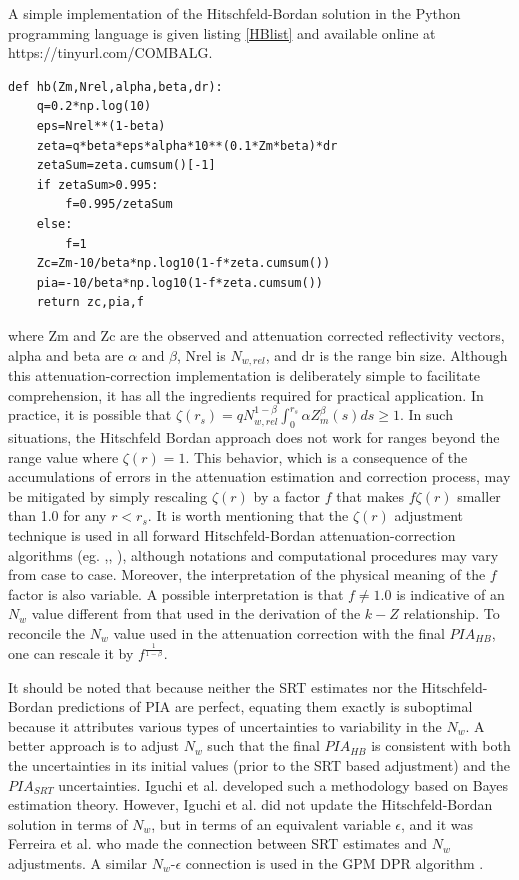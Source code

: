 \documentclass[10pt]{ietbook}
\begin{document}
A simple implementation of the Hitschfeld-Bordan solution in the Python programming language is given listing \ref{HBlist} and
available online at \\https://tinyurl.com/COMBALG.
\begin{lstlisting}[caption={Python implementation of the Histchfeld-Bordan solution.},captionpos=b,label={HBlist}]
def hb(Zm,Nrel,alpha,beta,dr):
    q=0.2*np.log(10)
    eps=Nrel**(1-beta)
    zeta=q*beta*eps*alpha*10**(0.1*Zm*beta)*dr
    zetaSum=zeta.cumsum()[-1]
    if zetaSum>0.995:
        f=0.995/zetaSum
    else:
        f=1
    Zc=Zm-10/beta*np.log10(1-f*zeta.cumsum())
    pia=-10/beta*np.log10(1-f*zeta.cumsum())
    return zc,pia,f
\end{lstlisting}
where Zm and Zc are the observed and attenuation corrected reflectivity vectors, alpha and beta are $\alpha$ and $\beta$, Nrel is $N_{w,rel}$,
and dr is the range bin size.  Although this attenuation-correction implementation is deliberately simple to 
facilitate comprehension, it has all the ingredients
required for practical application.  In practice, it is possible that $\zeta (r_s) =q N_{w,rel}^{1-\beta} \int_0^{r_s}\alpha Z_m^\beta(s)ds \geq 1$. In 
such situations, the Hitschfeld Bordan approach does not work for ranges beyond the range value where $\zeta (r)=1$.  This behavior, which is 
a consequence of the  accumulations of errors in the attenuation estimation and correction process, may be mitigated by simply rescaling 
$\zeta(r)$ by a factor $f$ that makes $f \zeta(r)$ smaller than 1.0 for any $r<r_s$.  It is worth mentioning that the $\zeta(r)$ adjustment
technique is used in all forward Hitschfeld-Bordan attenuation-correction algorithms (eg. \cite{iguchi_meneghini_1994},\cite{iguchi2000},
\cite{iguchi_dpr}),
although notations and computational procedures may vary from case to case.  Moreover, the interpretation of the physical meaning of 
the $f$ factor is also variable.  A possible interpretation is that $f\ne1.0$ is indicative of an $N_w$ value different from that
used in the derivation of the $k-Z$ relationship. To reconcile the $N_w$ value used in the attenuation correction with the final $PIA_{HB}$, 
one can rescale it by $f^{\frac 1 {1-\beta}}$. 

It should be noted that because neither the SRT estimates nor the Hitschfeld-Bordan predictions of PIA are perfect,
equating them exactly is suboptimal because it attributes various types of uncertainties to variability in the $N_w$.
A better approach is to adjust $N_w$ such that the final $PIA_{HB}$ is consistent with both the uncertainties in its
initial values (prior to the SRT based adjustment) and the $PIA_{SRT}$ uncertainties. Iguchi et al. \cite{iguchi2000}
developed such a methodology based on Bayes estimation theory. However, Iguchi et al. \cite{iguchi2000} did not update
the Hitschfeld-Bordan solution in terms of $N_w$, but in terms of an equivalent variable $\epsilon$, and it was Ferreira
et al. \cite{ferreira2001} who made the connection between SRT estimates and $N_w$ adjustments. A similar $N_w$-$\epsilon$
connection is used in the GPM DPR algorithm \cite{iguchi_dpr}. 
\end{document}
